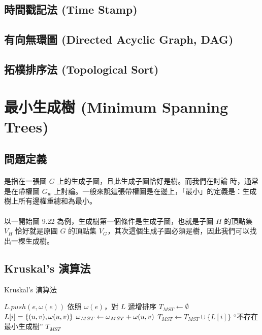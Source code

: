 \documentclass[12pt,a4paper,oneside]{report}
\begin{document}
\begin{CJK}{UTF8}{bkai}
\subsection{時間戳記法 (Time Stamp)}
\subsection{有向無環圖 (Directed Acyclic Graph, DAG)}
\subsection{拓樸排序法 (Topological Sort)}

\section{最小生成樹 (Minimum Spanning Trees)}

\subsection{問題定義}
\paragraph{} 是指在一張圖 $G$ 上的生成子圖，且此生成子圖恰好是樹。而我們在討論\textbf{} 時，通常是在帶權圖 $G_w$ 上討論。一般來說這張帶權圖是在邊上，「最小」的定義是：生成樹上所有邊權重總和為最小。
\paragraph{}以一開始圖 9.22 為例，生成樹第一個條件是生成子圖，也就是子圖 $H$ 的頂點集 $V_H$ 恰好就是原圖 $G$ 的頂點集 $V_G$，其次這個生成子圖必須是樹，因此我們可以找出一棵生成樹。

\subsection{Kruskal's 演算法}
\begin{algorithm}
\caption{Kruskal's 演算法}
\label{algo:mst_kruskal}
\begin{algorithmic}[1]
    \State $L.push(e,\omega{(e)})$
  \EndFor
    \State {}
  \EndFor
  \State 依照 $\omega{(e)}$，對 $L$ 遞增排序
  \State $T_{MST}\gets{\emptyset}$
    \State $L[i]=\{{({u},{v}),\omega{\ensuremath{({u},{v})}}}\}$
      \State {}
      \State $\omega{}_{MST}\gets{\omega{}_{MST}+\omega{\ensuremath{({u},{v})}}}$
      \State $T_{MST}\gets{T_{MST}\cup{\{L[i]\}}}$
    \EndIf
  \EndFor
    \State \Return ``不存在最小生成樹''
  \EndIf
  \State \Return $T_{MST}$
\EndProcedure
\end{algorithmic}
\end{algorithm}


\end{CJK}
\end{document}
